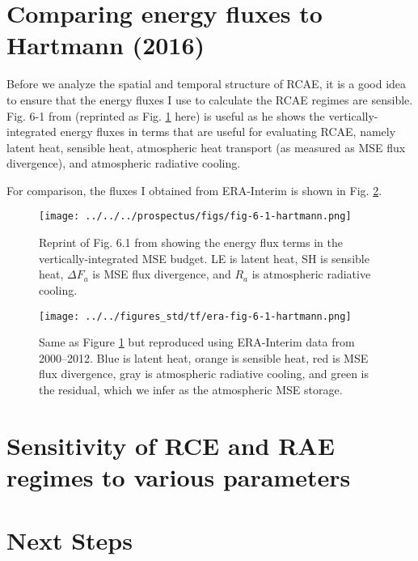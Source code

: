 \documentclass[11pt]{article}
\begin{document}
\section{Comparing energy fluxes to Hartmann (2016)}
\label{sec:org6912b6e}
Before we analyze the spatial and temporal structure of RCAE, it is a good idea to ensure that the energy fluxes I use to calculate the RCAE regimes are sensible. Fig. 6-1 from \cite{hartmann_global_2016} (reprinted as Fig. \ref{fig:orga1d3f39} here) is useful as he shows the vertically-integrated energy fluxes in terms that are useful for evaluating RCAE, namely latent heat, sensible heat, atmospheric heat transport (as measured as MSE flux divergence), and atmospheric radiative cooling.

For comparison, the fluxes I obtained from ERA-Interim is shown in Fig. \ref{fig:org85f4a7e}.

\begin{figure}[htbp]
\centering
\texttt{[image: ../../../prospectus/figs/fig-6-1-hartmann.png]}
\caption{\label{fig:orga1d3f39}Reprint of Fig. 6.1 from \cite{hartmann_global_2016} showing the energy flux terms in the vertically-integrated MSE budget. LE is latent heat, SH is sensible heat, \(\Delta F_a\) is MSE flux divergence, and \(R_a\) is atmospheric radiative cooling.}
\end{figure}

\begin{figure}[htbp]
\centering
\texttt{[image: ../../figures\_std/tf/era-fig-6-1-hartmann.png]}
\caption{\label{fig:org85f4a7e}Same as Figure \ref{fig:orga1d3f39} but reproduced using ERA-Interim data from 2000--2012. Blue is latent heat, orange is sensible heat, red is MSE flux divergence, gray is atmospheric radiative cooling, and green is the residual, which we infer as the atmospheric MSE storage.}
\end{figure}

\section{Sensitivity of RCE and RAE regimes to various parameters}
\label{sec:org3f22efd}

\section{Next Steps}
\label{sec:org79c8a4f}



\end{document}
